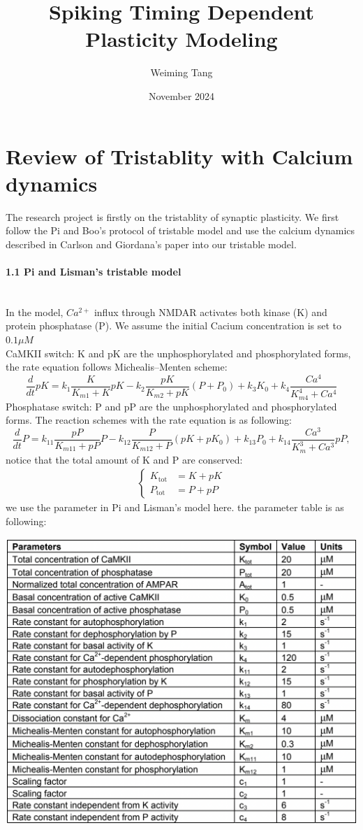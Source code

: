 \documentclass{article}
\title{Spiking Timing Dependent Plasticity Modeling}
\author{Weiming Tang}
\date{November 2024}
\begin{document}
\maketitle

\section{Review of Tristablity with Calcium dynamics}
The research project is firstly on the tristablity of synaptic plasticity. We first follow the Pi and Boo's protocol of tristable model and use the calcium dynamics described in Carlson and Giordana's paper into our tristable model.
\paragraph{1.1 Pi and Lisman's tristable model}\mbox{}\\
In the model, \(Ca^{2+}\) influx through NMDAR activates both kinase (K) and protein phosphatase (P). We assume the initial Cacium concentration is set to $0.1 \mu M$\\
\linebreak
CaMKII switch: K and pK are the unphosphorylated and phosphorylated forms, the rate equation follows Michealis–Menten scheme:
\begin{equation}
\frac{d}{dt}pK = k_1 \frac{K}{K_{m1} + K}pK - k_2 \frac{pK}{K_{m2} + pK}(P + P_0) + k_3K_0 + k_4 \frac{Ca^4}{K_{m4}^4 + Ca^4}
\end{equation}
\linebreak
Phosphatase switch: P and pP are the unphosphorylated and phosphorylated forms. The reaction schemes with the rate equation is as following:
\begin{equation}
    \frac{d}{dt}P = k_{11} \frac{pP}{K_{m11} + pP}P - k_{12} \frac{P}{K_{m12} + P}(pK + pK_0) + k_{13}P_0 + k_{14} \frac{Ca^3}{K_{m}^3 + Ca^3}pP,
\end{equation}
notice that the total amount of K and P are conserved:
\begin{align}
\left\{
\begin{aligned}
K_{\text{tot}} &= K + pK \\
P_{\text{tot}} &= P + pP
\end{aligned}
\right.
\end{align}
we use the parameter in Pi and Lisman's model here. the parameter table is as following:
        \begin{center}
        \includegraphics[width=.50\textwidth]{1.png}
    \end{center}
\end{document}
